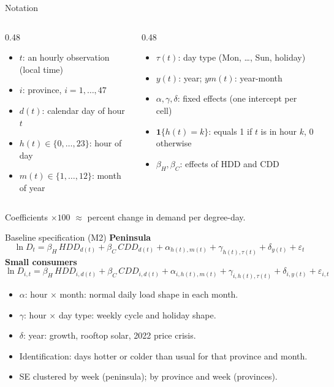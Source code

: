 \documentclass[aspectratio=169,11pt]{beamer}
\newcommand{\ind}{\mathbf{1}}
\begin{document}
\begin{frame}{Notation}
  \begin{columns}[T]
    \begin{column}{0.48\textwidth}
      \begin{itemize}\small
        \item $t$: an hourly observation (local time)
        \item $i$: province, $i = 1,\dots,47$
        \item $d(t)$: calendar day of hour $t$
        \item $h(t) \in \{0,\dots,23\}$: hour of day
        \item $m(t) \in \{1,\dots,12\}$: month of year
      \end{itemize}
    \end{column}
    \begin{column}{0.48\textwidth}
      \begin{itemize}\small
        \item $\tau(t)$: day type (Mon, \dots, Sun, holiday)
        \item $y(t)$: year; $ym(t)$: year-month
        \item $\alpha, \gamma, \delta$: fixed effects (one intercept per cell)
        \item $\ind\{h(t)=k\}$: equals 1 if $t$ is in hour $k$, 0 otherwise
        \item $\beta_H, \beta_C$: effects of HDD and CDD
      \end{itemize}
    \end{column}
  \end{columns}
  \vspace{8pt}
  \small Coefficients $\times 100$ $\approx$ percent change in demand per degree-day.
\end{frame}

\begin{frame}{Baseline specification (M2)}
  \textbf{Peninsula}
  \[
    \ln D_t = \beta_H\, HDD_{d(t)} + \beta_C\, CDD_{d(t)}
      + \alpha_{h(t),m(t)} + \gamma_{h(t),\tau(t)} + \delta_{y(t)} + \varepsilon_t
  \]
  \textbf{Small consumers}
  \[
    \ln D_{i,t} = \beta_H\, HDD_{i,d(t)} + \beta_C\, CDD_{i,d(t)}
      + \alpha_{i,h(t),m(t)} + \gamma_{i,h(t),\tau(t)} + \delta_{i,y(t)} + \varepsilon_{i,t}
  \]
  \begin{itemize}\small
    \item $\alpha$: hour $\times$ month: normal daily load shape in each month.
    \item $\gamma$: hour $\times$ day type: weekly cycle and holiday shape.
    \item $\delta$: year: growth, rooftop solar, 2022 price crisis.
    \item Identification: days hotter or colder than usual for that province and month.
    \item SE clustered by week (peninsula); by province and week (provinces).
  \end{itemize}
\end{frame}
\end{document}

